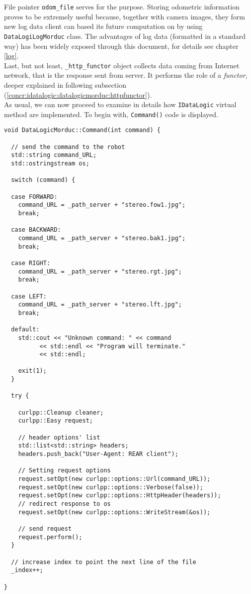 File pointer \texttt{odom\_file} serves for the purpose. Storing
odometric information proves to be extremely useful because,
together with camera images, they form new log data client can
based its future computation on by using \texttt{DataLogiLogMorduc}
class. The advantages of log data (formatted in a standard way)
has been widely exposed through
this document, for details see chapter \ref{log}.
\\
Last, but not least, \texttt{\_http\_functor} object
collects data coming from Internet network, that is the response sent from
server. It performs the role of a \textit{functor}, deeper explained in
following subsection (\ref{concr:idatalogic:datalogicmorduc:httpfunctor}).
\\
As usual, we can now proceed to examine in details how \texttt{IDataLogic}
virtual method are implemented. To begin with, \texttt{Command()} code is
displayed.
\\
\begin{lstlisting}[caption={\texttt{DataLogicMorduc::Command() method}},
    label={code:datalogicmorduc:command}]
void DataLogicMorduc::Command(int command) {

  // send the command to the robot
  std::string command_URL;
  std::ostringstream os;

  switch (command) {

  case FORWARD:
    command_URL = _path_server + "stereo.fow1.jpg";
    break;

  case BACKWARD:
    command_URL = _path_server + "stereo.bak1.jpg";
    break;

  case RIGHT:
    command_URL = _path_server + "stereo.rgt.jpg";
    break;

  case LEFT:
    command_URL = _path_server + "stereo.lft.jpg";
    break;

  default:
    std::cout << "Unknown command: " << command
	      << std::endl << "Program will terminate."
	      << std::endl;

    exit(1);
  }
 
  try {

    curlpp::Cleanup cleaner;
    curlpp::Easy request;

    // header options' list
    std::list<std::string> headers;
    headers.push_back("User-Agent: REAR client"); 

    // Setting request options
    request.setOpt(new curlpp::options::Url(command_URL));
    request.setOpt(new curlpp::options::Verbose(false));
    request.setOpt(new curlpp::options::HttpHeader(headers));
    // redirect response to os
    request.setOpt(new curlpp::options::WriteStream(&os));    
    
    // send request
    request.perform();    
  }
       
  // increase index to point the next line of the file
  _index++;

}
\end{lstlisting}

